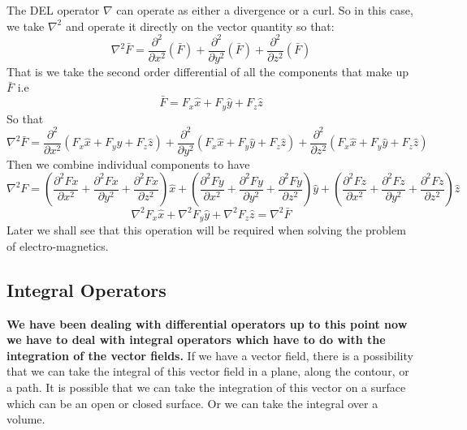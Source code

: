The DEL operator $\nabla$ can operate as either a divergence or a curl. So in this case, we take $\nabla^2$ and operate it directly on the vector quantity so that:
\begin{dmath}
\nabla^{2} \bar{F} = \frac{\partial ^ {2}}{\partial x^{2}}(\bar{F}) + \frac{\partial ^ {2}}{\partial y^{2}}(\bar{F}) + \frac{\partial ^ {2}}{\partial z^{2}}(\bar{F})
\end{dmath}
That is we take the second order differential of all the components that make up $\bar{F}$ i.e
\begin{equation*}
\bar{F} = F_{x}\hat x + F_{y}\hat y + F_{z}\hat z
\end{equation*}
So that
\begin{dmath}
\nabla^{2} \bar{F} = \frac{\partial ^ {2}}{\partial x^{2}}(F_{x}\hat x + F_{y}\hat y + F_{z}\hat z) + \frac{\partial ^ {2}}{\partial y^{2}}(F_{x}\hat x + F_{y}\hat y + F_{z}\hat z) + 
\frac{\partial ^ {2}}{\partial z^{2}}(F_{x}\hat x + F_{y}\hat y + F_{z}\hat z)
\end{dmath}
Then we combine individual components to have
\begin{dmath*}
\nabla^{2}F = (\frac{\partial ^{2} Fx}{\partial x^2} + \frac{\partial ^{2} Fx}{\partial y^2} + \frac{\partial ^{2} Fx}{\partial z^2})\hat{x} + (\frac{\partial ^{2} Fy}{\partial x^2} + \frac{\partial ^{2} Fy}{\partial y^2} + \frac{\partial ^{2} Fy}{\partial z^2})\hat{y} + (\frac{\partial ^{2} Fz}{\partial x^2} + \frac{\partial ^{2} Fz}{\partial y^2} + \frac{\partial ^{2} Fz}{\partial z^2})\hat{z}
\end{dmath*}
\begin{dmath}
\nabla^{2}F_x \hat x + \nabla^{2}F_y \hat y + \nabla^{2}F_z \hat z = \nabla^{2}\bar{F}
\end{dmath}
Later we shall see that this operation will be required when solving the problem of electro-magnetics.

\subsection{Integral Operators}

\textbf{We have been dealing with differential operators up to this point now we have to deal with integral operators which have to do with the integration of the vector fields.} If we have a vector field, there is a possibility that we can take the integral of this vector field in a plane, along the contour, or a path. It is possible that we can take the integration of this vector on a surface which can be an open or closed surface. Or we can take the integral over a volume. 

